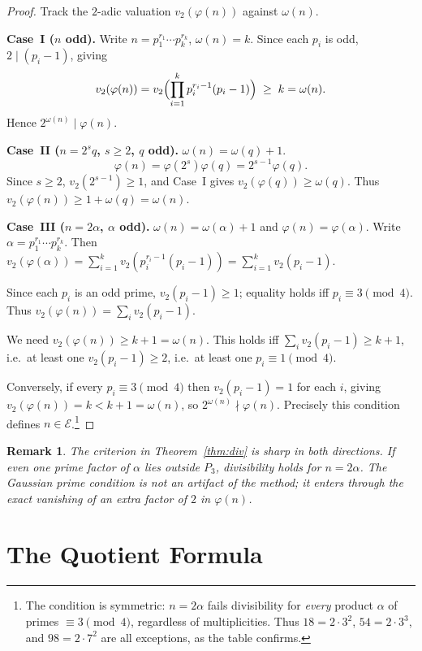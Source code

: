 \documentclass[12pt]{amsart}
\theoremstyle{bluehead}
\theoremstyle{orangehead}
\theoremstyle{greenhead}
\newtheorem{remark}[theorem]{Remark}
\renewcommand{\phi}{\varphi}
\newcommand{\Exc}{\mathcal{E}}
\begin{document}
\begin{proof}
Track the $2$-adic valuation $v_2(\phi(n))$ against $\omega(n)$.

\smallskip\noindent
\textbf{Case~I ($n$ odd).}\;
Write $n=p_1^{r_1}\cdots p_k^{r_k}$, $\omega(n)=k$.
Since each $p_i$ is odd, $2\mid(p_i-1)$, giving
\[
  v_2(\phi(n))=v_2\Bigl(\prod_{i=1}^k p_i^{r_i-1}(p_i-1)\Bigr)
  \;\ge\; k=\omega(n).
\]
Hence $2^{\omega(n)}\mid\phi(n)$.

\smallskip\noindent
\textbf{Case~II ($n=2^s q$, $s\ge2$, $q$ odd).}\;
$\omega(n)=\omega(q)+1$.
\[
  \phi(n)=\phi(2^s)\phi(q)=2^{s-1}\phi(q).
\]
Since $s\ge2$, $v_2(2^{s-1})\ge1$, and Case~I gives
$v_2(\phi(q))\ge\omega(q)$.  Thus $v_2(\phi(n))\ge1+\omega(q)=\omega(n)$.

\smallskip\noindent
\textbf{Case~III ($n=2\alpha$, $\alpha$ odd).}\;
$\omega(n)=\omega(\alpha)+1$ and $\phi(n)=\phi(\alpha)$.
Write $\alpha=p_1^{r_1}\cdots p_k^{r_k}$.  Then
$v_2(\phi(\alpha))=\sum_{i=1}^k v_2(p_i^{r_i-1}(p_i-1))=\sum_{i=1}^k v_2(p_i-1)$.

Since each $p_i$ is an odd prime,
$v_2(p_i-1)\ge1$; equality holds iff $p_i\equiv3\pmod4$.
Thus $v_2(\phi(n))=\sum_i v_2(p_i-1)$.

We need $v_2(\phi(n))\ge k+1=\omega(n)$.  This holds iff
$\sum_i v_2(p_i-1)\ge k+1$, i.e.\ at least one $v_2(p_i-1)\ge2$,
i.e.\ at least one $p_i\equiv1\pmod4$.

Conversely, if every $p_i\equiv3\pmod4$ then $v_2(p_i-1)=1$ for each
$i$, giving $v_2(\phi(n))=k<k+1=\omega(n)$, so
$2^{\omega(n)}\nmid\phi(n)$.
Precisely this condition defines $n\in\Exc$.\footnote{%
  The condition is symmetric: $n=2\alpha$ fails divisibility for
  \emph{every} product $\alpha$ of primes $\equiv3\pmod4$, regardless
  of multiplicities.  Thus $18=2\cdot3^2$, $54=2\cdot3^3$, and
  $98=2\cdot7^2$ are all exceptions, as the table confirms.}
\qedhere
\end{proof}

\begin{remark}
  The criterion in Theorem~\ref{thm:div} is sharp in both directions.
  If even one prime factor of $\alpha$ lies outside $P_3$, divisibility
  holds for $n=2\alpha$.  The Gaussian prime condition is not an artifact
  of the method; it enters through the exact vanishing of an extra
  factor of $2$ in $\phi(n)$.
\end{remark}

\section{The Quotient Formula}\label{sec:quot}
\end{document}
